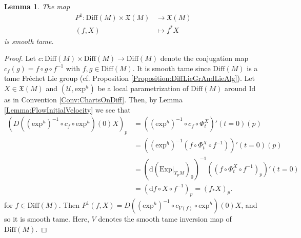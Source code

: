 \documentclass[12pt,a4paper]{article}
\theoremstyle{plain}
\newtheorem{lemma}[theorem]{Lemma}
\theoremstyle{definition}
\newcommand{\VFs}{\mathfrak{X}(M)}
\newcommand{\Diff}{\mathrm{Diff}(M)}
\newcommand{\exh}{\mathrm{exp}^h}
\newcommand{\Id}{\mathrm{Id}}
\newcommand{\Ucal}{\mathcal{U}}
\renewcommand{\d}{\mathrm{d}}
\begin{document}
\begin{lemma}
\label{Lemma:PullbackVfields}
The map 
\begin{align*}
    P^1:\Diff \times \VFs& \longrightarrow \VFs\\
    (f,X)&\longmapsto f^*X
\end{align*}
is smooth tame.
\end{lemma}
\begin{proof}
Let $c:\Diff\times \Diff\to \Diff$ denote the conjugation map $c_f(g)=f\circ g\circ f^{-1}$ with $f,g\in \Diff$. It is smooth tame since $\Diff$ is a tame Fréchet Lie group (cf. Proposition \ref{Proposition:DiffLieGrAndLieAlg}).
Let $X\in \VFs$ and $(\Ucal,\exh)$ be a local parametrization of $\Diff$ around $\Id$ as in Convention \ref{Conv:ChartsOnDiff}. Then, by Lemma \ref{Lemma:FlowInitialVelocity} we see that
\begin{align*}
    (D((\exh)^{-1}\circ c_f\circ \exh)(0)X)_p&=((\exh)^{-1}\circ c_f\circ \Phi_t^X)'(t=0)(p)\\
    &=((\exh)^{-1}(f\circ \Phi_t^X\circ f^{-1}))'(t=0)(p)\\
    &=(\d(\left.\mathrm{Exp}\right|_{T_pM})_0)^{-1}((f\circ \Phi_t^X\circ f^{-1})_p)'(t=0)\\
    &=(\d f\circ X\circ f^{-1})_p=(f_*X)_p.
\end{align*}
for $f\in \Diff$.
Then $P^1(f,X)=D((\exh)^{-1}\circ c_{V(f)}\circ \exh)(0)X$, and so it is smooth tame. Here, $V$ denotes the smooth tame inversion map of $\Diff$.
\end{proof}
\end{document}
